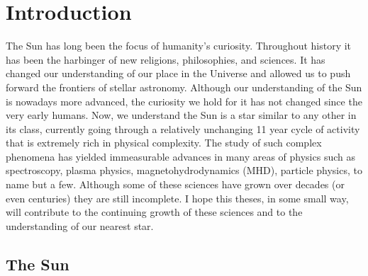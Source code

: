 \chapter{Introduction}
\label{chap:1}

The Sun has long been the focus of humanity's curiosity. Throughout history it has been the harbinger of new religions, philosophies, and sciences. It has changed our understanding of our place in the Universe and allowed us to push forward the frontiers of stellar astronomy. Although our understanding of the Sun is nowadays more advanced, the curiosity we hold for it has not changed since the very early humans.
Now, we understand the Sun is a star similar to any other in its class, currently going through a relatively unchanging 11 year cycle of activity that is extremely rich in physical complexity. The study of such complex phenomena has yielded immeasurable advances in many areas of physics such as spectroscopy, plasma physics, magnetohydrodynamics (MHD), particle physics, to name but a few. Although some of these sciences have grown over decades (or even centuries) they are still incomplete. I hope this theses, in some small way, will contribute to the continuing growth of these sciences and to the understanding of our nearest star.



\section{The Sun}\label{sec:1}

